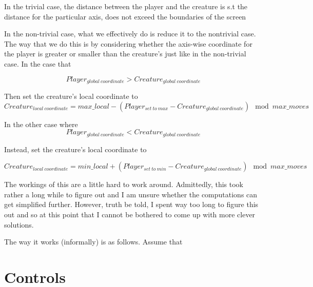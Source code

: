 \documentclass{report}
\begin{document}
In the trivial case, the distance between the player and the creature is s.t the distance for the particular axis, does not exceed the boundaries of the screen \newline

In the non-trivial case, what we effectively do is reduce it to the nontrivial case. The way that we do this is by considering whether the axis-wise coordinate for the player is greater or smaller than the creature's just like in the non-trivial case. In the case that

\[ Player_{global  \:coordinate} > Creature_{global \: coordinate} \]

Then set the creature's local coordinate to
\[ Creature_{local \: coordinate} = max\_local - (Player_{set \: to \: max} - Creature_{global \: coordinate} ) \mod  max\_moves  \]


In the other case where 
\[ Player_{global  \:coordinate} < Creature_{global \: coordinate} \]

Instead, set the creature's local coordinate to

\[ Creature_{local \: coordinate} = min\_local + (Player_{set \: to \: min} - Creature_{global \: coordinate} ) \mod  max\_moves  \]

The workings of this are a little hard to work around. Admittedly, this took rather a long while to figure out and I am unsure whether the computations can get simplified further. However, truth be told, I spent way too long to figure this out and so at this point that I cannot be bothered to come up with more clever solutions. \newline

The way it works (informally) is as follows. Assume that



\section{Controls}
\end{document}
